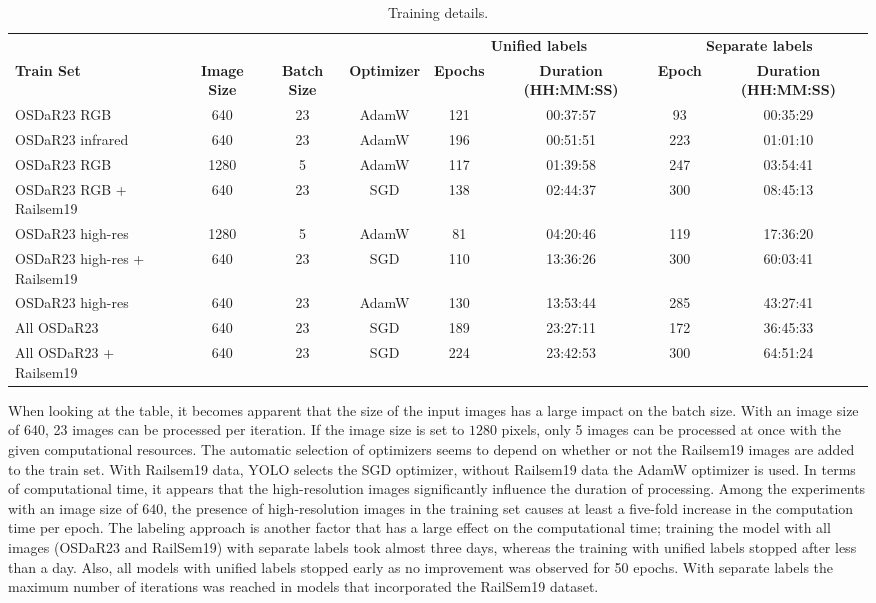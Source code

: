 \documentclass[Master,MDS,english]{BASE/twbook} %
\begin{document}
 
\begin{table}[H]
    \centering
    \tiny
    \begin{tabular}{|l|c|c|c|c|c|c|c|}
    \hline
    &  &  & & \multicolumn{2}{c|}{\textbf{Unified labels}}   & \multicolumn{2}{c|}{\textbf{Separate labels}}   \\ \cline{5-8}
    \textbf{Train Set} & \textbf{Image Size} & \textbf{Batch Size} & \textbf{Optimizer} & \textbf{Epochs} & \textbf{Duration (HH:MM:SS)} & \textbf{Epoch} & \textbf{Duration (HH:MM:SS)} \\
    \hline
    OSDaR23 RGB & 640 & 23 & AdamW & 121 & 00:37:57 & 93 & 00:35:29 \\
    OSDaR23 infrared & 640 & 23 & AdamW & 196 & 00:51:51 & 223 & 01:01:10 \\
    OSDaR23 RGB & 1280 & 5 & AdamW & 117 & 01:39:58 & 247 & 03:54:41 \\
    OSDaR23 RGB + Railsem19 & 640 & 23 & SGD & 138 & 02:44:37 & 300 & 08:45:13 \\
    OSDaR23 high-res & 1280 & 5 & AdamW & 81 & 04:20:46 & 119 & 17:36:20 \\
    OSDaR23 high-res + Railsem19 & 640 & 23 & SGD & 110 & 13:36:26 & 300 & 60:03:41 \\
    OSDaR23 high-res & 640 & 23 & AdamW & 130 & 13:53:44 & 285 & 43:27:41 \\
    All OSDaR23 & 640 & 23 & SGD & 189 & 23:27:11 & 172 & 36:45:33 \\
    All OSDaR23 + Railsem19 & 640 & 23 & SGD & 224 & 23:42:53 & 300 & 64:51:24 \\
    \hline
    \end{tabular}
    \caption{Training details.}
    \label{tab:training}
\end{table}
 
When looking at the table, it becomes apparent that the size of the input images has a large impact on the batch size. With an image size of $640$, 23 images can be processed per iteration. If the image size is set to $1280$ pixels, only 5 images can be processed at once with the given computational resources. The automatic selection of optimizers seems to depend on whether or not the Railsem19 images are added to the train set. With Railsem19 data, YOLO selects the SGD optimizer, without Railsem19 data the AdamW optimizer is used.   
In terms of computational time, it appears that the high-resolution images significantly influence the duration of processing. Among the experiments with an image size of $640$, the presence of high-resolution images in the training set causes at least a five-fold increase in the computation time per epoch. The labeling approach is another factor that has a large effect on the computational time; training the model with all images (OSDaR23 and RailSem19) with separate labels took almost three days, whereas the training with unified labels stopped after less than a day.
Also, all models with unified labels stopped early as no improvement was observed for 50 epochs. With separate labels  the maximum number of iterations was reached in models that incorporated the RailSem19 dataset. 
\end{document}
